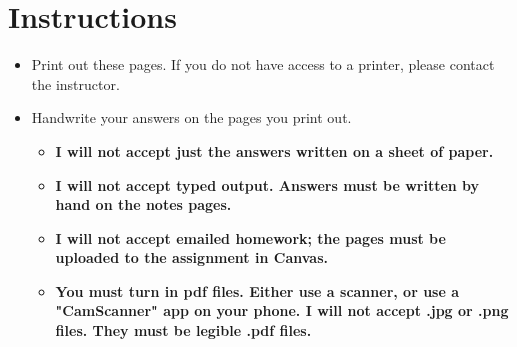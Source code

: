 \documentclass[letterpaper,12pt]{exam}
\begin{document}
\section*{Instructions}
\begin{itemize}
	\item Print out these pages.  If you do not have access to a printer, please contact the instructor.
	\item Handwrite your answers on the pages you print out. 
	   \begin{itemize}
		  \item \textbf{I will not accept just the answers written on a sheet of paper.}  
		  \item \textbf{I will not accept typed output.  Answers must be written by hand on the notes pages.}
		  \item \textbf{I will not accept emailed homework; the pages must be uploaded to the assignment in Canvas.}
		  \item \textbf{You must turn in pdf files.  Either use a scanner, or use a "CamScanner" app on your phone.  I will not accept .jpg or .png files.  They must be legible .pdf files.}
	   \end{itemize}

\end{itemize}
\end{document}
